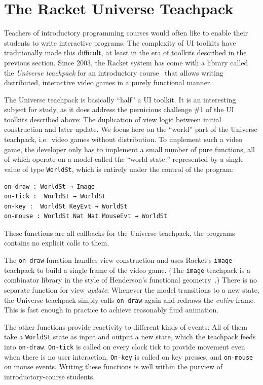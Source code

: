 \documentclass[sigplan,review,screen]{acmart}
\begin{document}
\section{The Racket Universe Teachpack}
\label{sec:universe-teachpack}

Teachers of introductory programming courses would often like to
enable their students to write interactive programs.  The complexity
of UI toolkits have traditionally made this difficult, at least in the
era of toolkits described in the previous section.  Since 2003, the Racket system
 has come with a library called the \textit{Universe teachpack} for an
introductory course~\cite{UniverseTeachpack} that allows writing
distributed, interactive video games in a purely functional manner.

The Universe teachpack is basically ``half'' a UI toolkit.  It is an
interesting subject for study, as it does address the pernicious
challenge \#1 of the UI toolkits described above: The duplication of
view logic between initial construction and later update.  We focus
here on the ``world'' part of the Universe teachpack, i.e.\ video
games without distribution.  To implement such a video game, the
developer only has to implement a small number of pure functions, all
of which operate on a model called the ``world state,'' represented by
a single value of type \texttt{WorldSt}, which is entirely under the
control of the program:
%
\begin{verbatim}
on-draw : WorldSt → Image
on-tick :  WorldSt → WorldSt
on-key :  WorldSt KeyEvt → WorldSt
on-mouse : WorldSt Nat Nat MouseEvt → WorldSt
\end{verbatim}
%
These functions are all callbacks for the Universe teachpack, the
programs contains no explicit calls to them.

The \texttt{on-draw} function handles view construction and uses Racket's
\texttt{image} teachpack to build a single frame of the video game.
(The \texttt{image} teachpack is a combinator library in the style of
Henderson's functional geometry~\cite{Henderson1982}.)  There is no
separate function for view \emph{update}: Whenever the model
transitions to a new state, the Universe teachpack simply calls
\texttt{on-draw} again and redraws the \emph{entire} frame.  This is
fast enough in practice to achieve reasonably fluid animation.

The other functions provide reactivity to different kinds of events:
All of them take a \texttt{WorldSt} state as input and output a new
state, which the teachpack feeds into \texttt{on-draw}.
\texttt{On-tick} is called on every clock tick to provide movement
even when there is no user interaction.  \texttt{On-key} is called on
key presses, and \texttt{on-mouse} on mouse events.  Writing these
functions is well within the purview of introductory-course students.
\end{document}
